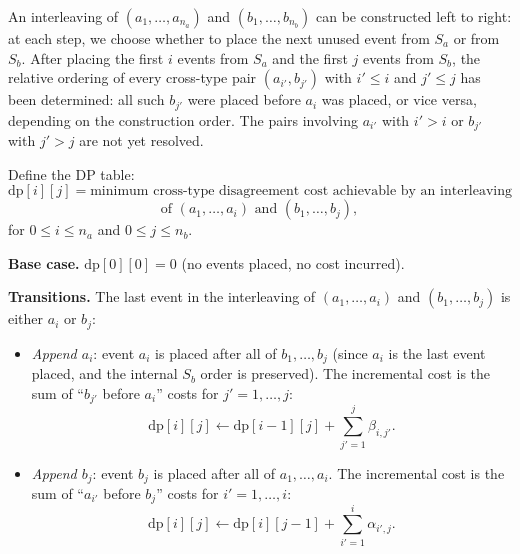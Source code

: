 \documentclass[11pt]{article}
\begin{document}
An interleaving of $(a_1, \ldots, a_{n_a})$ and $(b_1, \ldots, b_{n_b})$ can be constructed left to right: at each step, we choose whether to place the next unused event from $S_a$ or from $S_b$. After placing the first $i$ events from $S_a$ and the first $j$ events from $S_b$, the relative ordering of every cross-type pair $(a_{i'}, b_{j'})$ with $i' \le i$ and $j' \le j$ has been determined: all such $b_{j'}$ were placed before $a_i$ was placed, or vice versa, depending on the construction order. The pairs involving $a_{i'}$ with $i' > i$ or $b_{j'}$ with $j' > j$ are not yet resolved.

Define the DP table:
\begin{equation}
\mathrm{dp}[i][j] = \text{minimum cross-type disagreement cost achievable by an interleaving} 
\end{equation}
\[
\text{of $(a_1, \ldots, a_i)$ and $(b_1, \ldots, b_j)$},
\]
for $0 \le i \le n_a$ and $0 \le j \le n_b$.

\smallskip
\noindent\textbf{Base case.} $\mathrm{dp}[0][0] = 0$ (no events placed, no cost incurred).

\smallskip
\noindent\textbf{Transitions.} The last event in the interleaving of $(a_1, \ldots, a_i)$ and $(b_1, \ldots, b_j)$ is either $a_i$ or $b_j$:

\begin{itemize}
\item \emph{Append $a_i$}: event $a_i$ is placed after all of $b_1, \ldots, b_j$ (since $a_i$ is the last event placed, and the internal $S_b$ order is preserved). The incremental cost is the sum of ``$b_{j'}$ before $a_i$'' costs for $j' = 1, \ldots, j$:
\begin{equation}\label{eq:trans-a}
\mathrm{dp}[i][j] \longleftarrow \mathrm{dp}[i-1][j] + \sum_{j'=1}^{j} \beta_{i,j'}.
\end{equation}

\item \emph{Append $b_j$}: event $b_j$ is placed after all of $a_1, \ldots, a_i$. The incremental cost is the sum of ``$a_{i'}$ before $b_j$'' costs for $i' = 1, \ldots, i$:
\begin{equation}\label{eq:trans-b}
\mathrm{dp}[i][j] \longleftarrow \mathrm{dp}[i][j-1] + \sum_{i'=1}^{i} \alpha_{i',j}.
\end{equation}
\end{itemize}
\end{document}

